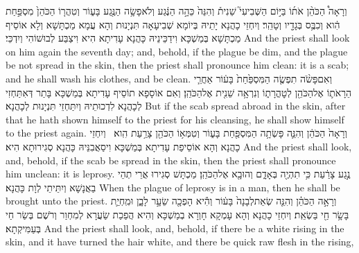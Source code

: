 {וְרָאָה֩ הַכֹּהֵ֨ן אֹת֜וֹ בַּיּ֣וֹם הַשְּׁבִיעִי֮ שֵׁנִית֒ וְהִנֵּה֙ כֵּהָ֣ה הַנֶּ֔גַע וְלֹא\maqqaf פָשָׂ֥ה הַנֶּ֖גַע בָּע֑וֹר וְטִהֲר֤וֹ הַכֹּהֵן֙ מִסְפַּ֣חַת הִ֔וא וְכִבֶּ֥ס בְּגָדָ֖יו וְטָהֵֽר׃}
{וְיִחְזֵי כָהֲנָא יָתֵיהּ בְּיוֹמָא שְׁבִיעָאָה תִּנְיָנוּת וְהָא עֲמָא מַכְתָּשָׁא וְלָא אוֹסֵיף מַכְתָּשָׁא בְּמַשְׁכָּא וִידַכֵּינֵיהּ כָּהֲנָא עָדִיתָא הִיא וִיצַבַּע לְבוּשׁוֹהִי וְיִדְכֵּי׃}
{And the priest shall look on him again the seventh day; and, behold, if the plague be dim, and the plague be not spread in the skin, then the priest shall pronounce him clean: it is a scab; and he shall wash his clothes, and be clean.}{}
{וְאִם\maqqaf פָּשֹׂ֨ה תִפְשֶׂ֤ה הַמִּסְפַּ֙חַת֙ בָּע֔וֹר אַחֲרֵ֧י הֵרָאֹת֛וֹ אֶל\maqqaf הַכֹּהֵ֖ן לְטׇהֳרָת֑וֹ וְנִרְאָ֥ה שֵׁנִ֖ית אֶל\maqqaf הַכֹּהֵֽן׃}
{וְאִם אוֹסָפָא תוֹסֵיף עָדִיתָא בְּמַשְׁכָּא בָּתַר דְּאִתַּחְזִי לְכָהֲנָא לִדְכוּתֵיהּ וְיִתַּחְזֵי תִּנְיָנוּת לְכָהֲנָא׃}
{But if the scab spread abroad in the skin, after that he hath shown himself to the priest for his cleansing, he shall show himself to the priest again.}{}
{וְרָאָה֙ הַכֹּהֵ֔ן וְהִנֵּ֛ה פָּשְׂתָ֥ה הַמִּסְפַּ֖חַת בָּע֑וֹר וְטִמְּא֥וֹ הַכֹּהֵ֖ן צָרַ֥עַת הִֽוא׃ \petucha }
{וְיִחְזֵי כָהֲנָא וְהָא אוֹסֵיפַת עָדִיתָא בְּמַשְׁכָּא וִיסַאֲבִנֵּיהּ כָּהֲנָא סְגִירוּתָא הִיא׃}
{And the priest shall look, and, behold, if the scab be spread in the skin, then the priest shall pronounce him unclean: it is leprosy.}{}
{נֶ֣גַע צָרַ֔עַת כִּ֥י תִהְיֶ֖ה בְּאָדָ֑ם וְהוּבָ֖א אֶל\maqqaf הַכֹּהֵֽן׃}
{מַכְתָּשׁ סְגִירוּ אֲרֵי תְהֵי בַאֲנָשָׁא וְיִתֵּיתֵי לְוָת כָּהֲנָא׃}
{When the plague of leprosy is in a man, then he shall be brought unto the priest.}{}
{וְרָאָ֣ה הַכֹּהֵ֗ן וְהִנֵּ֤ה שְׂאֵת\maqqaf לְבָנָה֙ בָּע֔וֹר וְהִ֕יא הָפְכָ֖ה שֵׂעָ֣ר לָבָ֑ן וּמִֽחְיַ֛ת בָּשָׂ֥ר חַ֖י בַּשְׂאֵֽת׃}
{וְיִחְזֵי כָהֲנָא וְהָא עָמְקָא חָוְרָא בְמַשְׁכָּא וְהִיא הֲפַכַת שַׂעֲרָא לְמִחְוַר וְרֹשֶׁם בְּשַׂר חַי בְּעַמִּיקְתָא׃}
{And the priest shall look, and, behold, if there be a white rising in the skin, and it have turned the hair white, and there be quick raw flesh in the rising,}{}
